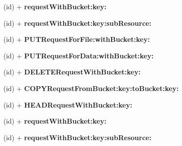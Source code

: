 \begin{DoxyCompactItemize}
\item 
\hypertarget{interface_a_s_i_s3_object_request_a8fc06d7585b85db69f81678fc1560ab0}{
(id) + {\bfseries request\-With\-Bucket\-:key\-:}}
\label{interface_a_s_i_s3_object_request_a8fc06d7585b85db69f81678fc1560ab0}

\item 
\hypertarget{interface_a_s_i_s3_object_request_aac357e6e8d9eab201a5d97c6e2ad1574}{
(id) + {\bfseries request\-With\-Bucket\-:key\-:sub\-Resource\-:}}
\label{interface_a_s_i_s3_object_request_aac357e6e8d9eab201a5d97c6e2ad1574}

\item 
\hypertarget{interface_a_s_i_s3_object_request_a07ff4bdb86902d59cb602be9bdc7ac14}{
(id) + {\bfseries \-P\-U\-T\-Request\-For\-File\-:with\-Bucket\-:key\-:}}
\label{interface_a_s_i_s3_object_request_a07ff4bdb86902d59cb602be9bdc7ac14}

\item 
\hypertarget{interface_a_s_i_s3_object_request_a06b5bf032c9b54a0fd0b17e0d1fecad5}{
(id) + {\bfseries \-P\-U\-T\-Request\-For\-Data\-:with\-Bucket\-:key\-:}}
\label{interface_a_s_i_s3_object_request_a06b5bf032c9b54a0fd0b17e0d1fecad5}

\item 
\hypertarget{interface_a_s_i_s3_object_request_a0602fac9aee5730f513b0a49e2be0dd9}{
(id) + {\bfseries \-D\-E\-L\-E\-T\-E\-Request\-With\-Bucket\-:key\-:}}
\label{interface_a_s_i_s3_object_request_a0602fac9aee5730f513b0a49e2be0dd9}

\item 
\hypertarget{interface_a_s_i_s3_object_request_a0048cc08b9cfef9c78abd81faa472d48}{
(id) + {\bfseries \-C\-O\-P\-Y\-Request\-From\-Bucket\-:key\-:to\-Bucket\-:key\-:}}
\label{interface_a_s_i_s3_object_request_a0048cc08b9cfef9c78abd81faa472d48}

\item 
\hypertarget{interface_a_s_i_s3_object_request_a88538201f1def9da2ff385880b78c8ef}{
(id) + {\bfseries \-H\-E\-A\-D\-Request\-With\-Bucket\-:key\-:}}
\label{interface_a_s_i_s3_object_request_a88538201f1def9da2ff385880b78c8ef}

\item 
\hypertarget{interface_a_s_i_s3_object_request_a8fc06d7585b85db69f81678fc1560ab0}{
(id) + {\bfseries request\-With\-Bucket\-:key\-:}}
\label{interface_a_s_i_s3_object_request_a8fc06d7585b85db69f81678fc1560ab0}

\item 
\hypertarget{interface_a_s_i_s3_object_request_aac357e6e8d9eab201a5d97c6e2ad1574}{
(id) + {\bfseries request\-With\-Bucket\-:key\-:sub\-Resource\-:}}
\label{interface_a_s_i_s3_object_request_aac357e6e8d9eab201a5d97c6e2ad1574}


\end{DoxyCompactItemize}

